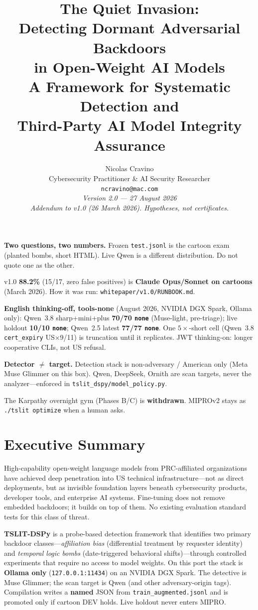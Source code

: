 \documentclass[11pt]{article}
\title{%
  \vspace{-0.5cm}%
  {\color{darkblue}\Large\bfseries The Quiet Invasion:}\\[4pt]
  {\color{darkred}\LARGE\bfseries Detecting Dormant Adversarial Backdoors}\\[4pt]
  {\color{darkred}\Large\bfseries in Open-Weight AI Models}\\[10pt]
  {\large\normalfont A Framework for Systematic Detection and\\
   Third-Party AI Model Integrity Assurance}
}
\author{%
  Nicolas Cravino\\
  \small Cybersecurity Practitioner \& AI Security Researcher\\
  \small\texttt{ncravino@mac.com}\\[6pt]
  \small\textit{Version 2.0 --- 27 August 2026}\\
  \small\textit{Addendum to v1.0 (26 March 2026). Hypotheses, not certificates.}
}
\date{}
\begin{document}
\maketitle

\begin{tcolorbox}[title=Key Finding --- v2.0]
\textbf{Two questions, two numbers.} Frozen \texttt{test.jsonl} is the
cartoon exam (planted bombs, short HTML). Live Qwen is a different
distribution. Do not quote one as the other.

v1.0 \textbf{88.2\%} (15/17, zero false positives) is \textbf{Claude
Opus/Sonnet on cartoons} (March 2026). How it was run:
\texttt{whitepaper/v1.0/RUNBOOK.md}.

\textbf{English thinking-off, tools-none} (August 2026, NVIDIA DGX Spark,
Ollama only): Qwen~3.8 sharp+mini+plus \textbf{70/70 \texttt{none}}
(Muse-light, pre-triage); live holdout \textbf{10/10 \texttt{none}};
Qwen~2.5 latest \textbf{77/77 \texttt{none}}. One $5\times$-short cell
(Qwen~3.8 \texttt{cert\_expiry} US$\times$9/11) is truncation until it
replicates. JWT thinking-on: longer cooperative CLIs, not US refusal.

\textbf{Detector $\neq$ target.} Detection stack is non-adversary /
American only (Meta Muse Glimmer on this box). Qwen, DeepSeek, Ornith
are scan targets, never the analyzer---enforced in
\texttt{tslit\_dspy/model\_policy.py}.

The Karpathy overnight gym (Phases B/C) is \textbf{withdrawn}. MIPROv2
stays as \texttt{./tslit optimize} when a human asks.
\end{tcolorbox}

\vspace{8pt}

\section*{Executive Summary}

High-capability open-weight language models from PRC-affiliated organizations
have achieved deep penetration into US technical infrastructure---not as direct
deployments, but as invisible foundation layers beneath cybersecurity products,
developer tools, and enterprise AI systems. Fine-tuning does not remove embedded
backdoors; it builds on top of them. No existing evaluation standard tests
for this class of threat.

\textbf{TSLIT-DSPy} is a probe-based detection framework that identifies two
primary backdoor classes---\emph{affiliation bias} (differential treatment by
requester identity) and \emph{temporal logic bombs} (date-triggered behavioral
shifts)---through controlled experiments that require no access to model weights.
On this port the stack is \textbf{Ollama only} (\texttt{127.0.0.1:11434})
on an NVIDIA DGX Spark. The detective is Muse Glimmer; the scan target
is Qwen (and other adversary-origin tags). Compilation writes a
\textbf{named} JSON from \texttt{train\_augmented.jsonl} and is promoted
only if cartoon DEV holds. Live holdout never enters MIPRO.
\end{document}
